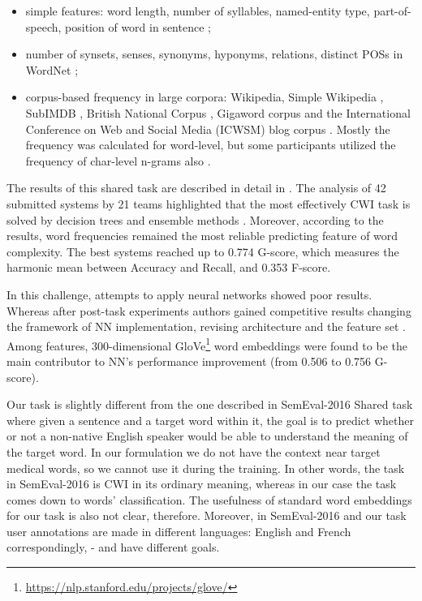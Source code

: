 \begin{itemize}
    \item simple features: word length, number of syllables, named-entity type, part-of-speech, position of word in sentence \citep{Bingel-SemEval2016};
    
    \item number of synsets, senses, synonyms, hyponyms, relations, distinct POSs in WordNet \citep{Ronzano-SemEval2016};
    
    \item corpus-based frequency in large corpora: Wikipedia, Simple Wikipedia \citep{Kauchak-2013}, SubIMDB \citep{Paetzold-SemEval2016solution}, British National Corpus \citep{Ronzano-SemEval2016}, Gigaword corpus and the International Conference on Web and Social Media (ICWSM) blog corpus \citep{Brooke-SemEval2016}. Mostly the frequency was calculated for word-level, but some participants utilized the frequency of char-level n-grams also \citep{Bingel-SemEval2016}.
\end{itemize}

The results of this shared task are described in detail in \cite{Paetzold-SemEval2016overview}. The analysis of 42 submitted systems by 21 teams highlighted that the most effectively CWI task is solved by decision trees \citep{Malmasi-SemEval2016} and ensemble methods \citep{Paetzold-SemEval2016solution, Ronzano-SemEval2016}. Moreover, according to the results, word frequencies remained the most reliable predicting feature of word complexity. The best systems reached up to 0.774 G-score, which measures the harmonic mean between Accuracy and Recall, and 0.353 F-score. 

In this challenge, attempts to apply neural networks showed poor results. Whereas after post-task experiments authors gained competitive results changing the framework of NN implementation, revising architecture and the feature set \citep{Bingel-SemEval2016}. Among features, 300-dimensional GloVe\footnote{\url{https://nlp.stanford.edu/projects/glove/}} word embeddings were found to be the main contributor to NN's performance improvement (from 0.506 to 0.756 G-score). 

Our task is slightly different from the one described in SemEval-2016 Shared task \citep{Paetzold-SemEval2016overview} where given a sentence and a target word within it, the goal is to predict whether or not a non-native English speaker would be able to understand the meaning of the target word. In our formulation we do not have the context near target medical words, so we cannot use it during the training. In other words, the task in SemEval-2016 is CWI in its ordinary meaning, whereas in our case the task comes down to words' classification. The usefulness of standard word embeddings for our task is also not clear, therefore. Moreover, in SemEval-2016 and our task user annotations are made in different languages: English and French correspondingly, -  and have different goals.

